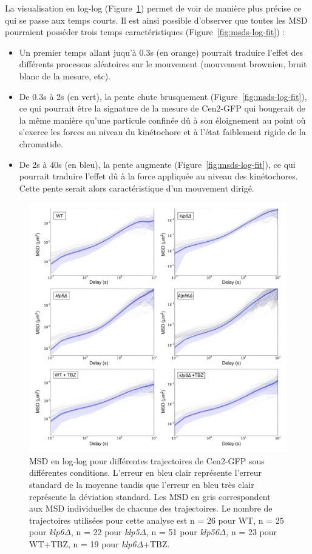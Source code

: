 \documentclass[12pt,a4paper,twoside,openright]{book}
\begin{document}
La visualisation en log-log (Figure~\ref{fig:msds-log}) permet de voir
de manière plus précise ce qui se passe aux temps courts. Il est ainsi
possible d'observer que toutes les MSD pourraient posséder trois temps
caractéristiques (Figure~\ref{fig:msds-log-fit}) :

\begin{itemize}
\item
  Un premier temps allant juqu'à 0.3s (en orange) pourrait traduire
  l'effet des différents processus aléatoires sur le mouvement
  (mouvement brownien, bruit blanc de la mesure, etc).
\item
  De 0.3s à 2s (en vert), la pente chute brusquement
  (Figure~\ref{fig:msds-log-fit}), ce qui pourrait être la signature de
  la mesure de Cen2-GFP qui bougerait de la même manière qu'une
  particule confinée dû à son éloignement au point où s'exerce les
  forces au niveau du kinétochore et à l'état faiblement rigide de la
  chromatide.
\item
  De 2s à 40s (en bleu), la pente augmente
  (Figure~\ref{fig:msds-log-fit}), ce qui pourrait traduire l'effet dû à
  la force appliquée au niveau des kinétochores. Cette pente serait
  alors caractéristique d'un mouvement dirigé.
\end{itemize}

\begin{figure}[htbp]
\centering
\includegraphics{figures/results/imaging/msds_log.png}
\caption[MSD en log-log pour différentes trajectoires de Cen2-GFP sous différentes conditions]{\label{fig:msds-log}MSD
en log-log pour différentes trajectoires de Cen2-GFP sous différentes
conditions. L'erreur en bleu clair représente l'erreur standard de la
moyenne tandis que l'erreur en bleu très clair représente la déviation
standard. Les MSD en gris correspondent aux MSD individuelles de chacune
des trajectoires. Le nombre de trajectoires utilisées pour cette analyse
est n = 26 pour WT, n = 25 pour \emph{klp6Δ}, n = 22 pour \emph{klp5Δ},
n = 51 pour \emph{klp56Δ}, n = 23 pour WT+TBZ, n = 19 pour
\emph{klp6Δ}+TBZ.}
\end{figure}
\end{document}

